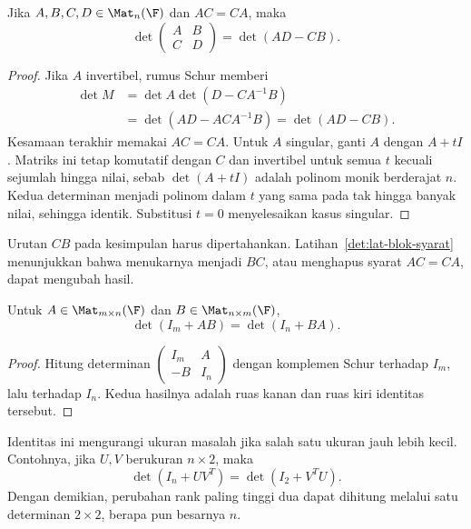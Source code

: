 \begin{thm}
      \label{det:blokkomutatif}
      Jika $A,B,C,D\in\Mat_n(\F)$ dan $AC=CA$, maka
      \[
            \det\begin{pmatrix}A&B\\C&D\end{pmatrix}=\det(AD-CB).
      \]
\end{thm}
\begin{proof}
      Jika $A$ invertibel, rumus Schur memberi
      \begin{align*}
            \det M
             & =\det A\det(D-CA^{-1}B)          \\
             & =\det(AD-ACA^{-1}B)=\det(AD-CB).
      \end{align*}
      Kesamaan terakhir memakai $AC=CA$.
      Untuk $A$ singular, ganti $A$ dengan $A+tI$.
      Matriks ini tetap komutatif dengan $C$ dan invertibel untuk semua
      $t$ kecuali sejumlah hingga nilai, sebab $\det(A+tI)$ adalah
      polinom monik berderajat $n$.
      Kedua determinan menjadi polinom dalam $t$ yang sama pada tak hingga
      banyak nilai, sehingga identik. Substitusi $t=0$ menyelesaikan kasus singular.
\end{proof}

Urutan $CB$ pada kesimpulan harus dipertahankan.
Latihan~\ref{det:lat-blok-syarat} menunjukkan bahwa menukarnya menjadi
$BC$, atau menghapus syarat $AC=CA$, dapat mengubah hasil.

\begin{prop}
      Untuk $A\in\Mat_{m\times n}(\F)$ dan $B\in\Mat_{n\times m}(\F)$,
      \[
            \det(I_m+AB)=\det(I_n+BA).
      \]
\end{prop}
\begin{proof}
      Hitung determinan
      $\left(\begin{smallmatrix}I_m&A\\-B&I_n\end{smallmatrix}\right)$
      dengan komplemen Schur terhadap $I_m$, lalu terhadap $I_n$.
      Kedua hasilnya adalah ruas kanan dan ruas kiri identitas tersebut.
\end{proof}

Identitas ini mengurangi ukuran masalah jika salah satu ukuran jauh
lebih kecil. Contohnya, jika $U,V$ berukuran $n\times2$, maka
\[
      \det(I_n+UV^T)=\det(I_2+V^TU).
\]
Dengan demikian, perubahan rank paling tinggi dua dapat dihitung
melalui satu determinan $2\times2$, berapa pun besarnya $n$.

